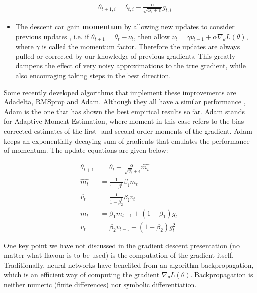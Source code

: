 \documentclass[pdftex,11pt,a4paper]{article}
\theoremstyle{definition}
\theoremstyle{remark}
\begin{document}
\begin{itemize}
    \begin{align*}
        \theta_{t+1, i} = \theta_{t, i} - \frac{\alpha}{\sqrt{G_i + \epsilon}}g_{t, i}
    \end{align*}
    \item The descent can gain \textbf{momentum} by allowing new updates to consider previous updates \cite{Ruder2015}, i.e. if $\theta_{t+1} = \theta_t - \nu_t$, then allow $\nu_t = \gamma\nu_{t-1} + \alpha\nabla_\theta L(\theta)$, where $\gamma$ is called the momentum factor. Therefore the updates are always pulled or corrected by our knowledge of previous gradients. This greatly dampens the effect of very noisy approximations to the true gradient, while also encouraging taking steps in the best direction.
    
\end{itemize}

\par Some recently developed algorithms that implement these improvements are Adadelta, RMSprop and Adam. Although they all have a similar performance \cite{Kingma2014}, Adam is the one that has shown the best empirical results so far. Adam stands for Adaptive Moment Estimation, where moment in this case refers to the bias-corrected estimates of the first- and second-order moments of the gradient. Adam keeps an exponentially decaying sum of gradients that emulates the performance of momentum. The update equations are given below:

\begin{align*}
    \theta_{t+1} &= \theta_t - \frac{\alpha}{\sqrt{\hat{v_t}} + \epsilon}\hat{m_t}\\
    \hat{m_t} &= \frac{1}{1 - \beta_1^t}\beta_1 m_t\\
    \hat{v_t} &= \frac{1}{1 - \beta_2^t}\beta_2 v_t\\
    m_t &= \beta_1m_{t-1} + (1 - \beta_1)g_t\\
    v_t &= \beta_2v_{t-1} + (1 - \beta_2)g_t^2
\end{align*}

\par One key point we have not discussed in the gradient descent presentation (no matter what flavour is to be used) is the computation of the gradient itself. Traditionally, neural networks have benefited from an algorithm backpropagation, which is an efficient way of computing the gradient $\nabla_\theta L(\theta)$. Backpropagation is neither numeric (finite differences) nor symbolic differentiation. 
\end{document}
